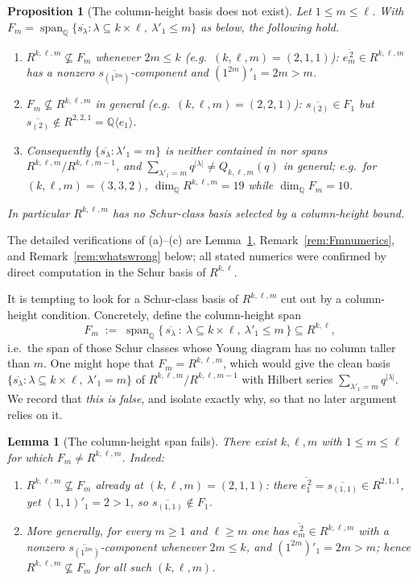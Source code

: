 \documentclass{amsart}
\newtheorem{lemma}{Lemma}
\newtheorem{proposition}{Proposition}
\theoremstyle{definition}
\newcommand{\Q}{\mathbb{Q}}
\newcommand{\rkl}{R^{k,\ell}}
\newcommand{\Rklm}{R^{k,\ell,m}}
\begin{document}
\begin{proposition}[The column-height basis does not exist]\label{prop:nocolbasis}
Let $1\le m\le\ell$. With
$F_m=\operatorname{span}_\Q\{\overline{s_\lambda}:\lambda\subseteq k\times\ell,\
\lambda'_1\le m\}$ as below, the following hold.
\begin{enumerate}
\item[\textup{(a)}] $\Rklm\not\subseteq F_m$ whenever $2m\le k$ \textup{(}e.g.\
$(k,\ell,m)=(2,1,1)$\textup{)}: $\overline{e_m^{\,2}}\in\Rklm$ has a nonzero
$\overline{s_{(1^{2m})}}$-component and $(1^{2m})'_1=2m>m$.
\item[\textup{(b)}] $F_m\not\subseteq\Rklm$ in general \textup{(}e.g.\
$(k,\ell,m)=(2,2,1)$\textup{)}: $\overline{s_{(2)}}\in F_1$ but
$\overline{s_{(2)}}\notin R^{2,2,1}=\Q\langle e_1\rangle$.
\item[\textup{(c)}] Consequently $\{\overline{s_\lambda}:\lambda'_1=m\}$ is
neither contained in nor spans $\Rklm/R^{k,\ell,m-1}$, and
$\sum_{\lambda'_1=m}q^{|\lambda|}\ne Q_{k,\ell,m}(q)$ in general; e.g.\ for
$(k,\ell,m)=(3,3,2)$, $\dim_\Q\Rklm=19$ while $\dim_\Q F_m=10$.
\end{enumerate}
In particular $\Rklm$ has no Schur-class basis selected by a column-height bound.
\end{proposition}

The detailed verifications of \textup{(a)}--\textup{(c)} are
Lemma~\ref{lem:Fmfails}, Remark~\ref{rem:Fmnumerics}, and
Remark~\ref{rem:whatswrong} below; all stated numerics were confirmed by direct
computation in the Schur basis of $\rkl$.

It is tempting to look for a Schur-class basis of $\Rklm$ cut out by a column-height
condition. Concretely, define the column-height span
\[
F_m \;:=\; \operatorname{span}_{\Q}\bigl\{\,\overline{s_\lambda}\ :\
\lambda\subseteq k\times\ell,\ \lambda'_1\le m\,\bigr\}\subseteq\rkl ,
\]
i.e.\ the span of those Schur classes whose Young diagram has no column taller than
$m$. One might hope that $F_m=\Rklm$, which would give the clean basis
$\{\overline{s_\lambda}:\lambda\subseteq k\times\ell,\ \lambda'_1=m\}$ of
$\Rklm/R^{k,\ell,m-1}$ with Hilbert series $\sum_{\lambda'_1=m}q^{|\lambda|}$. We
record that \emph{this is false}, and isolate exactly why, so that no later argument
relies on it.

\begin{lemma}[The column-height span fails]\label{lem:Fmfails}
There exist $k,\ell,m$ with $1\le m\le\ell$ for which $F_m\neq\Rklm$. Indeed:
\begin{enumerate}
\item[(i)] $\Rklm\not\subseteq F_m$ already at $(k,\ell,m)=(2,1,1)$: there
$\overline{e_1^{\,2}}=\overline{s_{(1,1)}}\in R^{2,1,1}$, yet $(1,1)'_1=2>1$, so
$\overline{s_{(1,1)}}\notin F_1$.
\item[(ii)] More generally, for every $m\ge1$ and $\ell\ge m$ one has
$\overline{e_m^{\,2}}\in\Rklm$ with a nonzero $\overline{s_{(1^{2m})}}$-component
whenever $2m\le k$, and $(1^{2m})'_1=2m>m$; hence $\Rklm\not\subseteq F_m$ for all
such $(k,\ell,m)$.
\end{enumerate}
\end{lemma}
\end{document}
